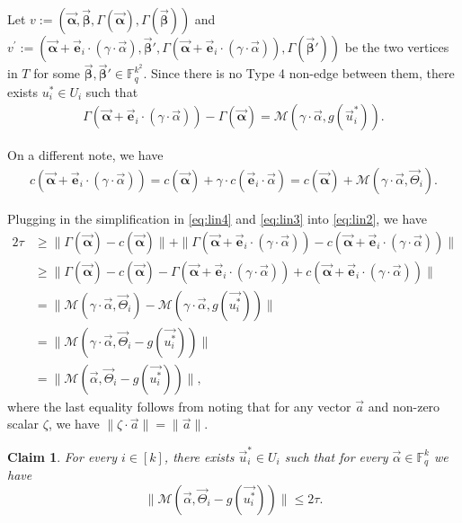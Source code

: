 \documentclass[11pt]{article}
\newcommand{\F}{\mathbb{F}}
\renewcommand{\ge}{ \geqslant}
\renewcommand{\le}{ \leqslant}
\newtheorem{claim}[theorem]{Claim}
\newcommand{\alphab}{\vec{\bm{\alpha}}}
\newcommand{\betab}{\vec{\bm{\beta}}}
\renewcommand{\kappa}{\tau}
\newcommand{\M}{\mathcal{M}}
\begin{document}
Let $v:=(\alphab,\betab,\Gamma(\alphab),\Gamma(\betab))$ and 
$v^{\prime}:=(\alphab+\vec{\bm e}_i\cdot (\gamma\cdot\vec{\alpha}),\betab',\Gamma(\alphab+\vec{\bm e}_i\cdot (\gamma\cdot\vec{\alpha})),\Gamma(\betab'))$  be the two vertices in $T$ for some $\betab,\betab'\in \F_q^{k^2}$. Since there  is no Type 4 non-edge between them,  there exists $u_i^\ast\in U_i$ such that  
\begin{align}
\Gamma(\alphab+\vec{\bm e}_i\cdot (\gamma\cdot\vec{\alpha}))-\Gamma(\alphab)=\M(\gamma\cdot\vec{\alpha},g(\vec{u}_i^\ast)).\label{eq:lin4}
\end{align}

 
On a different note, we have
\begin{align}
c(\vec{\bm{\alpha}}+\vec{\bm e}_i\cdot (\gamma\cdot\vec{\alpha}))=c(\vec{\bm{\alpha}})+\gamma\cdot c(\vec{\bm e}_i\cdot \vec{\alpha})=c(\vec{\bm{\alpha}})+\M(\gamma\cdot \vec{\alpha},\vec{\Theta}_i).
\label{eq:lin3}
\end{align}

Plugging in the simplification in \eqref{eq:lin4} and \eqref{eq:lin3} into \eqref{eq:lin2}, we have
\allowdisplaybreaks
\begin{align*}
2\kappa&\ge\|\Gamma(\vec{\bm{\alpha}})-c(\vec{\bm{\alpha}})\|+\|\Gamma(\vec{\bm{\alpha}}+\vec{\bm e}_i\cdot (\gamma\cdot\vec{\alpha}))-c(\vec{\bm{\alpha}}+\vec{\bm e}_i\cdot (\gamma\cdot\vec{\alpha}))\|\\
&\ge\|\Gamma(\vec{\bm{\alpha}})-c(\vec{\bm{\alpha}})-\Gamma(\vec{\bm{\alpha}}+\vec{\bm e}_i\cdot (\gamma\cdot\vec{\alpha}))+c(\vec{\bm{\alpha}}+\vec{\bm e}_i\cdot (\gamma\cdot\vec{\alpha}))\|\\
&=\|\M(\gamma\cdot \vec{\alpha},\vec{\Theta}_i)-\M(\gamma\cdot\vec{\alpha},g(\vec{u_i^\ast})) \|\\
&=\|\M(\gamma\cdot \vec{\alpha},\vec{\Theta}_i-g(\vec{u_i^\ast})) \|\\
&=\|\M(  \vec{\alpha},\vec{\Theta}_i-g(\vec{u_i^\ast})) \|,
\end{align*}
 where the last equality follows from noting that for any vector $\vec{a}$ and non-zero scalar $\zeta$, we have $\|\zeta\cdot \vec{a}\|=\|\vec{a}\|$.



 
 
\begin{claim}\label{claim:decodei}
For every $i\in[k]$, there exists $\vec{u}_i^\ast\in U_i$  such that  for every $\vec{\alpha}\in\F_q^k$ we have $$ \|\M(  \vec{\alpha},\vec{\Theta}_i-g(\vec{u_i^\ast})) \|\le 2\kappa.$$ 
\end{claim}
\end{document}
